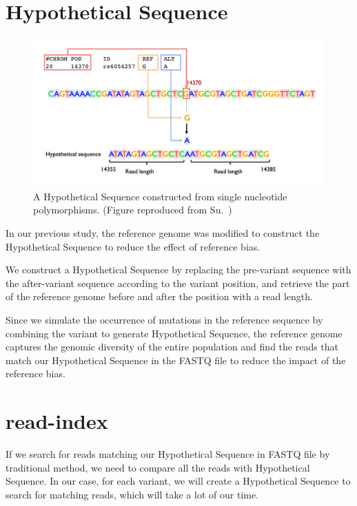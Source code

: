 \documentclass[PhD]{PHlab-thesis}
\begin{document}
\section{Hypothetical Sequence}
\begin{figure}[h!]
	\centering
	\includegraphics[scale=0.25]{figures/Hypothetical Sequence.png}
	\caption{A Hypothetical Sequence constructed from single nucleotide polymorphisms. (Figure reproduced from Su.~\cite{Su2021RI})}
	\label{fig:Hypothetical Sequence} %
\end{figure}
In our previous study, the reference genome was modified to construct the Hypothetical Sequence to reduce the effect of reference bias.

We construct a Hypothetical Sequence by replacing the pre-variant sequence with the after-variant sequence according to the variant position, and retrieve the part of the reference genome before and after the position with a read length.

Since we simulate the occurrence of mutations in the reference sequence by combining the variant to generate Hypothetical Sequence, the reference genome captures the genomic diversity of the entire population and find the reads that match our Hypothetical Sequence in the FASTQ file to reduce the impact of the reference bias.
\section{read-index}
If we search for reads matching our Hypothetical Sequence in FASTQ file by traditional method, we need to compare all the reads with Hypothetical Sequence. In our case, for each variant, we will create a Hypothetical Sequence to search for matching reads, which will take a lot of our time.
\end{document}
